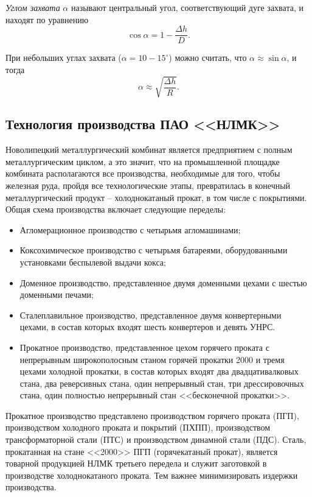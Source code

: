 \textit{Углом захвата} $\alpha$ называют центральный угол, соответствующий дуге захвата, и находят по уравнению $$\cos \alpha = 1 - \frac{\Delta h}{D}.$$

При небольших углах захвата ($\alpha = 10 - 15^\circ$) можно считать, что $\alpha \approx \sin \alpha$, и тогда $$\alpha \approx \sqrt{\frac{\Delta h}{R}}.$$


\subsection{Технология производства ПАО <<НЛМК>>}

Новолипецкий металлургический комбинат является предприятием с полным металлургическим циклом, а это значит, что на промышленной площадке комбината располагаются все производства, необходимые для того, чтобы железная руда, пройдя все технологические этапы, превратилась в конечный металлургический продукт – холоднокатаный прокат, в том числе с покрытиями.
Общая схема производства включает следующие переделы: 

\begin{itemize}
\item Агломерационное производство с четырьмя агломашинами;
\item Коксохимическое производство с четырьмя батареями, оборудованными установками беспылевой выдачи кокса;
\item Доменное производство, представленное двумя доменными цехами с шестью доменными печами;
\item Сталеплавильное производство, представленное двумя конвертерными цехами, в состав которых входят шесть конвертеров и девять УНРС.
\item Прокатное производство, представленное цехом горячего проката с непрерывным широкополосным станом горячей прокатки 2000 и тремя цехами холодной прокатки, в состав которых входят два двадцативалковых стана, два реверсивных стана, один непрерывный стан, три дрессировочных стана, один полностью непрерывный стан <<бесконечной прокатки>>.
\end{itemize}

Прокатное производство представлено производством горячего проката (ПГП), производством холодного проката и покрытий (ПХПП), производством трансформаторной стали (ПТС) и производством динамной стали (ПДС). Сталь, прокатанная на стане <<2000>> ПГП (горячекатаный прокат), является товарной продукцией НЛМК третьего передела и служит заготовкой в производстве холоднокатаного проката. Тем важнее минимизировать издержки производства.

